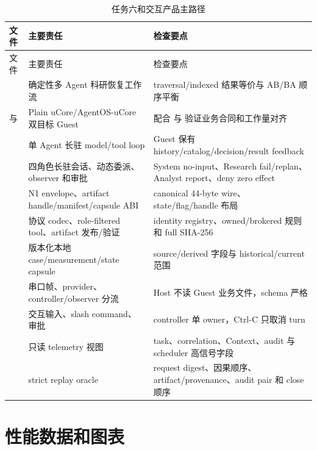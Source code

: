\begin{longtable}{L{3.8cm}L{3.3cm}L{6.2cm}}
  \caption{任务六和交互产品主路径}\label{tab:source-nexus}\\
  \toprule
  文件 & 主要责任 & 检查要点 \\
  \midrule
  \endfirsthead
  \toprule
  文件 & 主要责任 & 检查要点 \\
  \midrule
  \endhead
   & 确定性多 Agent 科研恢复工作流 & traversal/indexed 结果等价与 AB/BA 顺序平衡 \\
   与  & Plain uCore/AgentOS-uCore 双目标 Guest & 配合  与  验证业务合同和工作量对齐 \\
   & 单 Agent 长驻 model/tool loop & Guest 保有 history/catalog/decision/result feedback \\
   & 四角色长驻会话、动态委派、observer 和审批 & System no-input、Research fail/replan、Analyst report、deny zero effect \\
   & N1 envelope、artifact handle/manifest/capsule ABI & canonical 44-byte wire、state/flag/handle 布局 \\
   & 协议 codec、role-filtered tool、artifact 发布/验证 & identity registry、owned/brokered 规则和 full SHA-256 \\
   & 版本化本地 case/measurement/state capsule & source/derived 字段与 historical/current 范围 \\
   & 串口帧、provider、controller/observer 分流 & Host 不读 Guest 业务文件，schema 严格 \\
   & 交互输入、slash command、审批 & controller 单 owner，Ctrl-C 只取消 turn \\
   & 只读 telemetry 视图 & task、correlation、Context、audit 与 scheduler 高信号字段 \\
   & strict replay oracle & request digest、因果顺序、artifact/provenance、audit pair 和 close 顺序 \\
  \bottomrule
\end{longtable}

\section{性能数据和图表}

